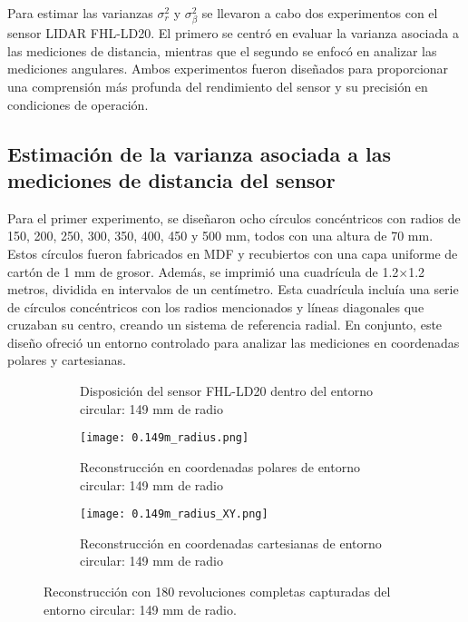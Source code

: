 Para estimar las varianzas $\sigma_r^2$ y $\sigma_\beta^2$ se llevaron a cabo dos experimentos con el sensor LIDAR FHL-LD20.  El primero se centró en evaluar la varianza asociada a las mediciones de distancia, mientras que el segundo se enfocó en analizar las mediciones angulares. Ambos experimentos fueron diseñados para proporcionar una comprensión más profunda del rendimiento del sensor y su precisión en condiciones de operación.

\subsection{Estimación de la varianza asociada a las mediciones de distancia del sensor}
\label{var_dist}
Para el primer experimento, se diseñaron ocho círculos concéntricos con radios de 150, 200, 250, 300, 350, 400, 450 y 500 mm, todos con una altura de 70 mm. Estos círculos fueron fabricados en MDF y recubiertos con una capa uniforme de cartón de 1 mm de grosor. Además, se imprimió una cuadrícula de 1.2$\times$1.2 metros, dividida en intervalos de un centímetro. Esta cuadrícula incluía una serie de círculos concéntricos con los radios mencionados y líneas diagonales que cruzaban su centro, creando un sistema de referencia radial. En conjunto, este diseño ofreció un entorno controlado para analizar las mediciones en coordenadas polares y cartesianas.

\begin{figure}[H]
	\centering
	\begin{subfigure}{\textwidth}
		\centering
		\caption{Disposición del sensor FHL-LD20 dentro del entorno circular: 149 mm de radio}
		\label{fig:disposicion_lidar_var1}
		\vspace{1em}
	\end{subfigure}
	\begin{subfigure}{0.45\textwidth}
		\centering
		\texttt{[image: 0.149m\_radius.png]}
		\caption{Reconstrucción en coordenadas polares de entorno circular: 149 mm de radio}
		\label{fig:149m_radius_xy}
	\end{subfigure}
	\hspace{1em}
	\begin{subfigure}{0.45\textwidth}
		\centering
		\texttt{[image: 0.149m\_radius\_XY.png]}
		\caption{Reconstrucción en coordenadas cartesianas de entorno circular: 149 mm de radio}
		\label{fig:149m_radius}
	\end{subfigure}
	\caption{Reconstrucción con 180 revoluciones completas capturadas del entorno circular: 149 mm de radio.}
	\label{fig:disposicion_lidar_var_dist1}
\end{figure}

